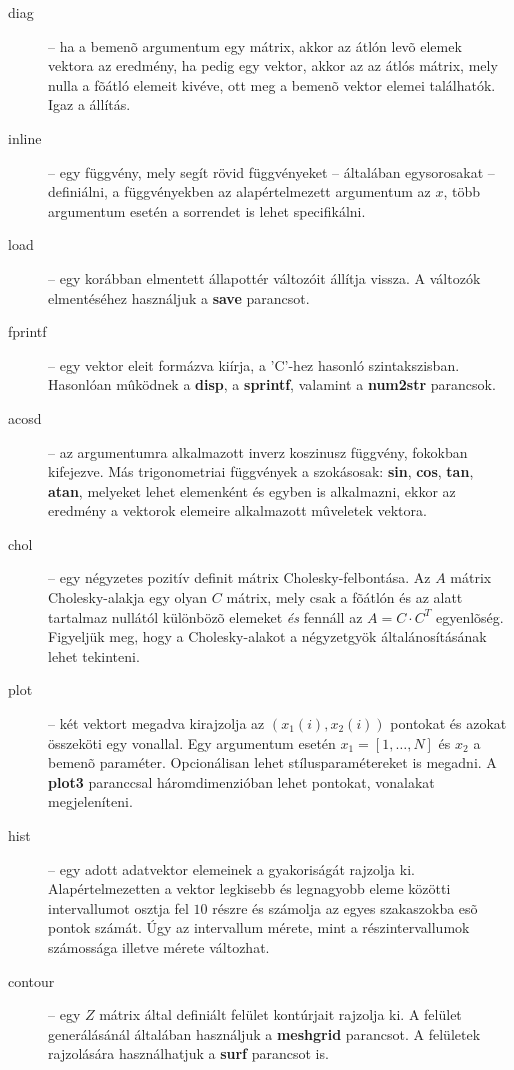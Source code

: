 \begin{description}
    \item[diag] -- ha a bemenõ argumentum egy mátrix, akkor az átlón levõ elemek vektora az eredmény, ha pedig egy vektor, akkor az az átlós mátrix, mely nulla a fõátló elemeit kivéve, ott meg a bemenõ vektor elemei találhatók. Igaz a  állítás.
    \item[inline] -- egy függvény, mely segít rövid függvényeket -- általában egysorosakat -- definiálni, a függvényekben az alapértelmezett argumentum az $x$, több argumentum esetén a sorrendet is lehet specifikálni.
    \item[load] -- egy korábban elmentett állapottér változóit állítja vissza. A változók elmentéséhez használjuk a {\bf save} parancsot.
    \item[fprintf] -- egy vektor eleit formázva kiírja, a 'C'-hez hasonló szintakszisban. Hasonlóan mûködnek a {\bf disp}, a {\bf sprintf}, valamint a {\bf num2str} parancsok.
    \item[acosd] -- az argumentumra alkalmazott inverz koszinusz függvény, fokokban kifejezve. Más trigonometriai függvények a szokásosak: {\bf sin}, {\bf cos}, {\bf tan}, {\bf atan}, melyeket lehet elemenként és egyben is alkalmazni, ekkor az eredmény a vektorok elemeire alkalmazott mûveletek vektora.
    \item[chol] -- egy négyzetes pozitív definit mátrix Cholesky-felbontása. Az $A$ mátrix Cholesky-alakja egy olyan $C$ mátrix, mely csak a fõátlón és az alatt tartalmaz nullától különbözõ elemeket {\em és} fennáll az $A = C\cdot C^T$ egyenlõség. Figyeljük meg, hogy a Cholesky-alakot a négyzetgyök általánosításának lehet tekinteni.
    \item[plot] -- két vektort megadva kirajzolja az $(x_1(i),x_2(i))$ pontokat és azokat összeköti egy vonallal. Egy argumentum esetén $x_1=[1,\ldots,N]$ és $x_2$ a bemenõ paraméter. Opcionálisan lehet stílusparamétereket is megadni. A {\bf plot3} paranccsal háromdimenzióban lehet pontokat, vonalakat megjeleníteni.
    \item[hist] -- egy adott adatvektor elemeinek a gyakoriságát rajzolja ki. Alapértelmezetten a vektor legkisebb és legnagyobb eleme közötti intervallumot osztja fel $10$ részre és számolja az egyes szakaszokba esõ pontok számát. Úgy az intervallum mérete, mint a részintervallumok számossága illetve mérete változhat.
    \item[contour] -- egy $Z$ mátrix által definiált felület kontúrjait rajzolja ki. A felület generálásánál általában használjuk a {\bf meshgrid} parancsot. A felületek rajzolására használhatjuk a {\bf surf} parancsot is.

\end{description}
